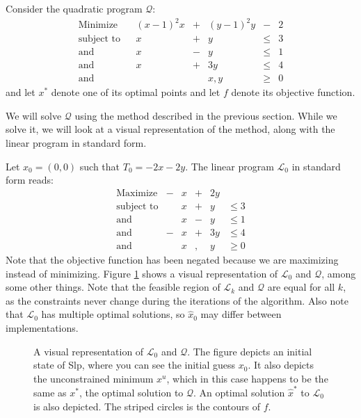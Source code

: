 Consider the quadratic program $\mathcal{Q}$:
\[
\begin{array}{lcrcrcr}
\textrm{Minimize}           & & (x-1)^2 x &+& (y-1)^2 y & - &  2 \\
\textrm{subject to}         & &         x &+&         y &\leq& 3 \\
\textrm{and}                & &         x &-&         y &\leq& 1 \\
\textrm{and}                & &         x &+&       3 y &\leq& 4 \\
\textrm{and}                & &           & &       x,y &\geq& 0
\end{array}
\]
and let $x^*$ denote one of its optimal points and let $f$ denote its objective
function.

We will solve $\mathcal{Q}$ using the method described in the previous
section. While we solve it, we will look at a visual representation of the
method, along with the linear program in standard form.

Let $x_0 = (0,0)$ such that $T_0 = -2x - 2y$. The linear program
$\mathcal{L}_0$ in standard form reads:
\[
\begin{array}{lcrcrl}
    \textrm{Maximize}   &-&   x &+& 2 y \\
    \textrm{subject to} & &   x &+&   y & \leq 3 \\
    \textrm{and}        & &   x &-&   y & \leq 1 \\
    \textrm{and}        &-&   x &+& 3 y & \leq 4 \\
    \textrm{and}        & &   x &,&   y & \geq 0
\end{array}
\]
Note that the objective function has been negated because we are maximizing
instead of minimizing.
Figure \ref{fig:lp1} shows a visual representation of $\mathcal{L}_0$ and
$\mathcal{Q}$, among some other things.
Note that the feasible region of $\mathcal{L}_k$ and
$\mathcal{Q}$ are equal for all $k$, as the constraints never change during the
iterations of the algorithm. Also note that $\mathcal{L}_0$ has multiple
optimal solutions, so $\hat{x}_0$ may differ between implementations.

\begin{figure}[h!]
    \centering
    
    \caption{A visual representation of $\mathcal{L}_0$ and $\mathcal{Q}$.
             The figure depicts an initial state
             of Slp, where you can see the initial guess $x_0$. It also
             depicts the unconstrained minimum $x^u$, which in this case
             happens to be the same as $x^*$, the optimal solution to
             $\mathcal{Q}$. An optimal solution $\hat{x}^*$ to $\mathcal{L}_0$
             is also depicted. The striped circles is the contours of $f$.}
    \label{fig:lp1}
\end{figure}

